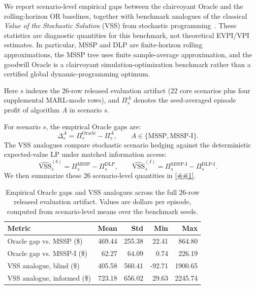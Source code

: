 \documentclass[10pt,a4paper]{article}
\providecommand{\Cref}[1]{\ref{##1}}
\begin{document}
We report scenario-level empirical gaps between the clairvoyant Oracle
and the rolling-horizon OR baselines, together with benchmark analogues
of the classical \emph{Value of the Stochastic Solution} (VSS) from
stochastic programming~\citep{birge2011}. These statistics are diagnostic
quantities for this benchmark, not theoretical EVPI/VPI estimates. In
particular, MSSP and DLP are finite-horizon rolling approximations, the
MSSP tree uses finite sample-average approximation, and the goodwill
Oracle is a clairvoyant simulation-optimization benchmark rather than a
certified global dynamic-programming optimum.

Here $s$ indexes the 26-row released evaluation artifact (22 core
scenarios plus four supplemental MARL-mode rows), and $\Pi_s^A$ denotes
the seed-averaged episode profit of algorithm $A$ in scenario $s$.

For scenario $s$, the empirical Oracle gaps are:
\begin{equation}
  \Delta^{A}_{s}
  =
  \Pi^{\text{Oracle}}_{s} - \Pi^{A}_{s},
  \qquad A \in \{\text{MSSP},\text{MSSP-I}\}.
\end{equation}
The VSS analogues compare stochastic scenario hedging against the
deterministic expected-value LP under matched information access:
\begin{equation}
  \widehat{\mathrm{VSS}}^{(b)}_{s} =
  \Pi^{\text{MSSP}}_{s} - \Pi^{\text{DLP}}_{s},
  \qquad
  \widehat{\mathrm{VSS}}^{(I)}_{s} =
  \Pi^{\text{MSSP-I}}_{s} - \Pi^{\text{DLP-I}}_{s}.
\end{equation}
We then summarize these 26 scenario-level quantities in
\Cref{tab:vpi_vss}.

\begin{table}[!tbp]
\centering
\caption[Empirical Oracle gaps and VSS analogues.]{%
  Empirical Oracle gaps and VSS analogues across the full 26-row
  released evaluation artifact. Values are dollars per episode, computed
  from scenario-level means over the benchmark seeds.}
\label{tab:vpi_vss}
\small
\renewcommand{\arraystretch}{1.05}
\begin{tabular}{@{} l r r r r @{}}
\toprule
\textbf{Metric} & \textbf{Mean} & \textbf{Std} & \textbf{Min} & \textbf{Max} \\
\midrule
Oracle gap vs. MSSP (\$)      & 469.44 & 255.38 & 22.41  & 864.80  \\
Oracle gap vs. MSSP-I (\$)    &  62.27 &  64.09 &  0.74  & 226.19  \\
VSS analogue, blind (\$)      & 405.58 & 560.41 & -92.71 & 1900.65 \\
VSS analogue, informed (\$)   & 723.18 & 656.02 & 29.63  & 2245.74 \\
\bottomrule
\end{tabular}
\end{table}
\end{document}

